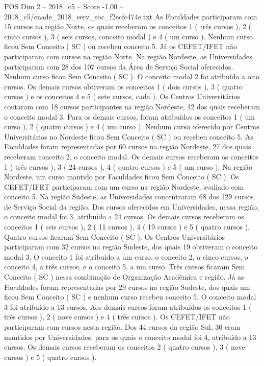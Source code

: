 \begin{textsample}{POS Dim 2 – 2018\_c5 – Score -1.00 – 2018\_c5/enade\_2018\_serv\_soc\_f2ecfc474e.txt}
As Faculdades participaram com 15 cursos na região Norte, os quais receberam os conceitos 1 ( três cursos ), 2 ( cinco cursos ), 3 ( seis cursos, conceito modal ) e 4 ( um curso ).
Nenhum curso ficou Sem Conceito ( SC ) ou recebeu conceito 5.
Já os CEFET/IFET não participaram com cursos na região Norte.
Na região Nordeste, as Universidades participaram com 28 dos 107 cursos da Área de Serviço Social oferecidos.
Nenhum curso ficou Sem Conceito ( SC ).
O conceito modal 2 foi atribuído a oito cursos.
Os demais cursos obtiveram os conceitos 1 ( dois cursos ), 3 ( quatro cursos ) e os conceitos 4 e 5 ( sete cursos, cada ).
Os Centros Universitários contaram com 18 cursos participantes na região Nordeste, 12 dos quais receberam o conceito modal 3.
Para os demais cursos, foram atribuídos os conceitos 1 ( um curso ), 2 ( quatro cursos ) e 4 ( um curso ).
Nenhum curso oferecido por Centros Universitários no Nordeste ficou Sem Conceito ( SC ) ou recebeu conceito 5.
As Faculdades foram representadas por 60 cursos na região Nordeste, 27 dos quais receberam conceito 2, o conceito modal.
Os demais cursos receberam os conceitos 1 ( três cursos ), 3 ( 24 cursos ), 4 ( quatro cursos ) e 5 ( um curso ).
Na região Nordeste, um curso mantido por Faculdades ficou Sem Conceito ( SC ).
Os CEFET/IFET participaram com um curso na região Nordeste, avaliado com conceito 5.
Na região Sudeste, as Universidades concentraram 68 dos 129 cursos de Serviço Social da região.
Dos cursos oferecidos em Universidades, nessa região, o conceito modal foi 3, atribuído a 24 cursos.
Os demais cursos receberam os conceitos 1 ( seis cursos ), 2 ( 11 cursos ), 4 ( 19 cursos ) e 5 ( quatro cursos ).
Quatro cursos ficaram Sem Conceito ( SC ).
Os Centros Universitários participaram com 32 cursos na região Sudeste, dos quais 19 obtiveram o conceito modal 3.
O conceito 1 foi atribuído a um curso, o conceito 2, a cinco cursos, o conceito 4, a três cursos, e o conceito 5, a um curso.
Três cursos ficaram Sem Conceito ( SC ) nessa combinação de Organização Acadêmica e região.
Já as Faculdades foram representadas por 29 cursos na região Sudeste, dos quais um ficou Sem Conceito ( SC ) e nenhum curso recebeu conceito 5.
O conceito modal 3 foi atribuído a 13 cursos.
Aos demais cursos foram atribuídos os conceitos 1 ( três cursos ), 2 ( nove cursos ) e 4 ( três cursos ).
Os CEFET/IFET não participaram com cursos nesta região.
Dos 44 cursos da região Sul, 30 eram mantidos por Universidades, para os quais o conceito modal foi 4, atribuído a 13 cursos.
Os demais cursos receberam os conceitos 2 ( quatro cursos ), 3 ( nove cursos ) e 5 ( quatro cursos ).

\end{textsample}
